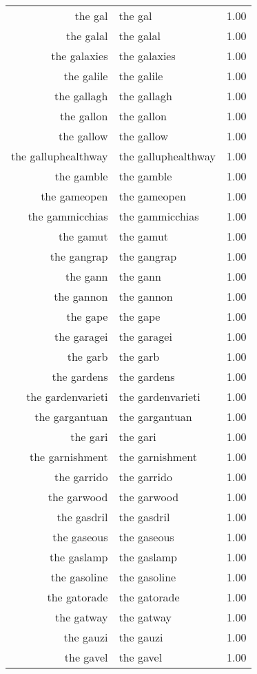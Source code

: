 \begin{table}[ht]
\begin{tabular}{rlr}
  the gal & the gal & 1.00 \\ 
  the galal & the galal & 1.00 \\ 
  the galaxies & the galaxies & 1.00 \\ 
  the galile & the galile & 1.00 \\ 
  the gallagh & the gallagh & 1.00 \\ 
  the gallon & the gallon & 1.00 \\ 
  the gallow & the gallow & 1.00 \\ 
  the galluphealthway & the galluphealthway & 1.00 \\ 
  the gamble & the gamble & 1.00 \\ 
  the gameopen & the gameopen & 1.00 \\ 
  the gammicchias & the gammicchias & 1.00 \\ 
  the gamut & the gamut & 1.00 \\ 
  the gangrap & the gangrap & 1.00 \\ 
  the gann & the gann & 1.00 \\ 
  the gannon & the gannon & 1.00 \\ 
  the gape & the gape & 1.00 \\ 
  the garagei & the garagei & 1.00 \\ 
  the garb & the garb & 1.00 \\ 
  the gardens & the gardens & 1.00 \\ 
  the gardenvarieti & the gardenvarieti & 1.00 \\ 
  the gargantuan & the gargantuan & 1.00 \\ 
  the gari & the gari & 1.00 \\ 
  the garnishment & the garnishment & 1.00 \\ 
  the garrido & the garrido & 1.00 \\ 
  the garwood & the garwood & 1.00 \\ 
  the gasdril & the gasdril & 1.00 \\ 
  the gaseous & the gaseous & 1.00 \\ 
  the gaslamp & the gaslamp & 1.00 \\ 
  the gasoline & the gasoline & 1.00 \\ 
  the gatorade & the gatorade & 1.00 \\ 
  the gatway & the gatway & 1.00 \\ 
  the gauzi & the gauzi & 1.00 \\ 
  the gavel & the gavel & 1.00 \\ 

\end{tabular}
\end{table}
